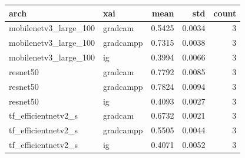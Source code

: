 \begin{tabular}{llrrr}
\toprule
arch & xai & mean & std & count \\
\midrule
mobilenetv3\_large\_100 & gradcam & 0.5425 & 0.0034 & 3 \\
mobilenetv3\_large\_100 & gradcampp & 0.7315 & 0.0038 & 3 \\
mobilenetv3\_large\_100 & ig & 0.3994 & 0.0066 & 3 \\
resnet50 & gradcam & 0.7792 & 0.0085 & 3 \\
resnet50 & gradcampp & 0.7824 & 0.0094 & 3 \\
resnet50 & ig & 0.4093 & 0.0027 & 3 \\
tf\_efficientnetv2\_s & gradcam & 0.6732 & 0.0021 & 3 \\
tf\_efficientnetv2\_s & gradcampp & 0.5505 & 0.0044 & 3 \\
tf\_efficientnetv2\_s & ig & 0.4071 & 0.0052 & 3 \\
\bottomrule
\end{tabular}
